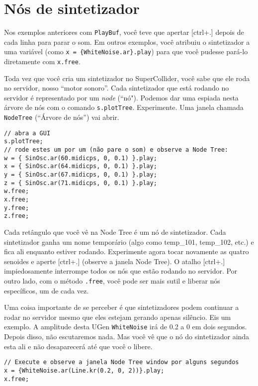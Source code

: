 \section{Nós de sintetizador}

Nos exemplos anteriores com \texttt{PlayBuf}, você teve que apertar [ctrl+.] depois de cada linha para parar o som. Em outros exemplos, você atribuiu o sintetizador a uma variável (como \texttt{x = \{WhiteNoise.ar\}.play}) para que você pudesse pará-lo diretamente com \texttt{x.free}.

Toda vez que você cria um sintetizador no SuperCollider, você sabe que ele roda no servidor, nosso “motor sonoro”. Cada sintetizador que está rodando no servidor é representado por um \emph{node} (“nó"). Podemos dar uma espiada nesta árvore de nós com o comando \texttt{s.plotTree}. Experimente. Uma janela chamada \texttt{NodeTree} (“Árvore de nós”) vai abrir.

 
\begin{lstlisting}[style=SuperCollider-IDE, basicstyle=\scttfamily\footnotesize]
// abra a GUI
s.plotTree;
// rode estes um por um (não pare o som) e observe a Node Tree:
w = { SinOsc.ar(60.midicps, 0, 0.1) }.play;
x = { SinOsc.ar(64.midicps, 0, 0.1) }.play;
y = { SinOsc.ar(67.midicps, 0, 0.1) }.play;
z = { SinOsc.ar(71.midicps, 0, 0.1) }.play;
w.free;
x.free;
y.free;
z.free;
\end{lstlisting}
 

Cada retângulo que você vê na Node Tree é um nó de sintetizador. Cada sintetizador ganha um nome temporário (algo como temp\_101, temp\_102, etc.) e fica ali enquanto estiver rodando. Experimente agora tocar novamente as quatro senoides e aperte [ctrl+.] (observe a janela Node Tree). O atalho [ctrl+.] impiedosamente interrompe todos os nós que estão rodando no servidor. Por outro lado, com o método \texttt{.free}, você pode ser mais sutil e liberar nós específicos, um de cada vez.

Uma coisa importante de se perceber é que sintetizadores podem continuar a rodar no servidor mesmo que eles estejam gerando apenas silêncio. Eis um exemplo. A amplitude desta UGen \texttt{WhiteNoise} irá de 0.2 a 0 em dois segundos. Depois disso, não escutaremos nada. Mas você vê que o nó do sintetizador ainda esta ali e não desaparecerá até que você o libere.

 
\begin{lstlisting}[style=SuperCollider-IDE, basicstyle=\scttfamily\footnotesize]
// Execute e observe a janela Node Tree window por alguns segundos
x = {WhiteNoise.ar(Line.kr(0.2, 0, 2))}.play;
x.free;
\end{lstlisting}
 


